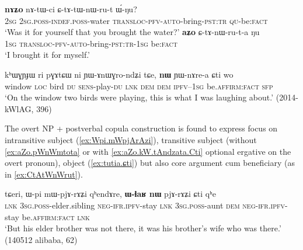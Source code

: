 \documentclass[oneside,a4paper,11pt]{article}
\begin{document}
\begin{exe}
\ex  \label{ex:CkAnWru}
\begin{xlist}
\ex \label{ex:CtAtWnWrut}
\gll \textbf{nɤʑo} nɤ-tɯ-ci ɕ-tɤ-tɯ-nɯ-ru-t ɯ́-ŋu? \\
\textsc{2sg} \textsc{2sg.poss}-\textsc{indef.poss}-water \textsc{transloc}-\textsc{pfv}-\textsc{auto}-bring-\textsc{pst}:\textsc{tr}  \textsc{qu}-be:\textsc{fact} \\
\glt `Was it for yourself that you brought the water?'
\ex \label{ex:CtAtWnWrut}
\gll \textbf{aʑo} ɕ-tɤ-nɯ-ru-t-a ŋu \\
\textsc{1sg} \textsc{transloc}-\textsc{pfv}-\textsc{auto}-bring-\textsc{pst}:\textsc{tr}-\textsc{1sg} be:\textsc{fact} \\
\glt `I brought it for myself.'
\end{xlist}
\end{exe}
 
 \begin{exe}
\ex \label{ex:nW.YWnArea}
\gll  kʰɯɣɲɟɯ ri pɣɤtɕɯ ni ɲɯ-ɤnɯɣro-ndʑi tɕe, \textbf{nɯ} ɲɯ-nɤre-a ɕti wo  \\
window \textsc{loc} bird \textsc{du} \textsc{sens}-play-\textsc{du} \textsc{lnk} \textsc{dem} \textsc{dem} \textsc{ipfv}--\textsc{1sg}  be.\textsc{affirm}:\textsc{fact} \textsc{sfp} \\
\glt `On the window two birds were playing, this is what I was laughing about.' (2014-kWlAG, 396)
\end{exe}


The overt NP + postverbal copula construction is found to express focus on intransitive subject (\ref{ex:Wpi.mWpjArAzi}), transitive subject (without \ref{ex:aZo.pWnWmtota} or with \ref{ex:aZo.kW.tAndzata.Cti} optional ergative on the overt pronoun), object (\ref{ex:tutia.ɕti}) but also core argument cum beneficiary (as in \ref{ex:CtAtWnWrut}).

\begin{exe}
\ex \label{ex:Wpi.mWpjArAzi}
\gll tɕeri, ɯ-pi mɯ-pjɤ-rɤʑi qʰendɤre,  \textbf{ɯ-ɬaʁ nɯ} pjɤ-rɤʑi ɕti qʰe  \\
\textsc{lnk} \textsc{3sg}.\textsc{poss}-elder.sibling \textsc{neg}-\textsc{ifr}.\textsc{ipfv}-stay \textsc{lnk} \textsc{3sg}.\textsc{poss}-aunt \textsc{dem} \textsc{neg}-\textsc{ifr}.\textsc{ipfv}-stay be.\textsc{affirm}:\textsc{fact} \textsc{lnk} \\
\glt  `But his elder brother was not there, it was his brother's wife who was there.' (140512 alibaba, 62)
\end{exe}
\end{document}
